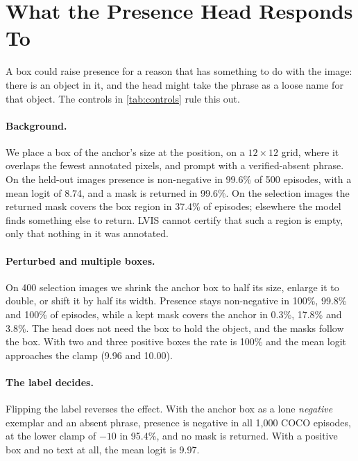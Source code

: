 \section{What the Presence Head Responds To}
\label{sec:mechanism}

\begin{table}[t]
    \centering
    \small
    \setlength{\tabcolsep}{3.2pt}
    \resizebox{\columnwidth}{!}{}
    \caption{\textbf{Controls.}
    Percent of episodes, and the mean presence logit.
    \emph{Object}: a kept mask covers the anchor.
    Boxes are positive exemplars unless marked.
    Rows with two and three boxes use the images that have that many further instances.}
    \label{tab:controls}
\end{table}

A box could raise presence for a reason that has something to do with the image: there is an object in it, and the head might take the phrase as a loose name for that object.
The controls in \cref{tab:controls} rule this out.

\paragraph{Background.}
We place a box of the anchor's size at the position, on a $12 \times 12$ grid, where it overlaps the fewest annotated pixels, and prompt with a verified-absent phrase.
On the held-out images presence is non-negative in 99.6\% of 500 episodes, with a mean logit of 8.74, and a mask is returned in 99.6\%.
On the selection images the returned mask covers the box region in 37.4\% of episodes; elsewhere the model finds something else to return.
LVIS cannot certify that such a region is empty, only that nothing in it was annotated.

\paragraph{Perturbed and multiple boxes.}
On 400 selection images we shrink the anchor box to half its size, enlarge it to double, or shift it by half its width.
Presence stays non-negative in 100\%, 99.8\% and 100\% of episodes, while a kept mask covers the anchor in 0.3\%, 17.8\% and 3.8\%.
The head does not need the box to hold the object, and the masks follow the box.
With two and three positive boxes the rate is 100\% and the mean logit approaches the clamp (9.96 and 10.00).

\paragraph{The label decides.}
Flipping the label reverses the effect.
With the anchor box as a lone \emph{negative} exemplar and an absent phrase, presence is negative in all 1,000 COCO episodes, at the lower clamp of $-10$ in 95.4\%, and no mask is returned.
With a positive box and no text at all, the mean logit is 9.97.

